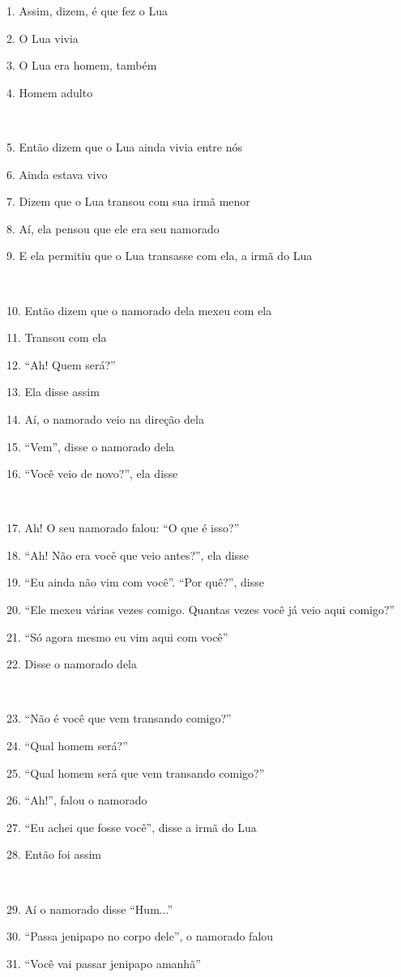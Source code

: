 1. Assim, dizem, é que fez o Lua

2. O Lua vivia

3. O Lua era homem, também

4. Homem adulto

~

5. Então dizem que o Lua ainda vivia entre nós

6. Ainda estava vivo

7. Dizem que o Lua transou com sua irmã menor

8. Aí, ela pensou que ele era seu namorado

9. E ela permitiu que o Lua transasse com ela, a irmã do Lua

~

10. Então dizem que o namorado dela mexeu com ela

11. Transou com ela

12. ``Ah! Quem será?''

13. Ela disse assim

14. Aí, o namorado veio na direção dela

15. ``Vem'', disse o namorado dela

16. ``Você veio de novo?'', ela disse

~

17. Ah! O seu namorado falou: ``O que é isso?''

18. ``Ah! Não era você que veio antes?'', ela disse

19. ``Eu ainda não vim com você''. ``Por quê?'', disse

20. ``Ele mexeu várias vezes comigo. Quantas vezes você já veio aqui comigo?''

21. ``Só agora mesmo eu vim aqui com você''

22. Disse o namorado dela

~

23. ``Não é você que vem transando comigo?''

24. ``Qual homem será?''

25. ``Qual homem será que vem transando comigo?''

26. ``Ah!'', falou o namorado

27. ``Eu achei que fosse você'', disse a irmã do Lua

28. Então foi assim

~

29. Aí o namorado disse ``Hum...''

30. ``Passa jenipapo no corpo dele'', o namorado falou

31. ``Você vai passar jenipapo amanhã''


